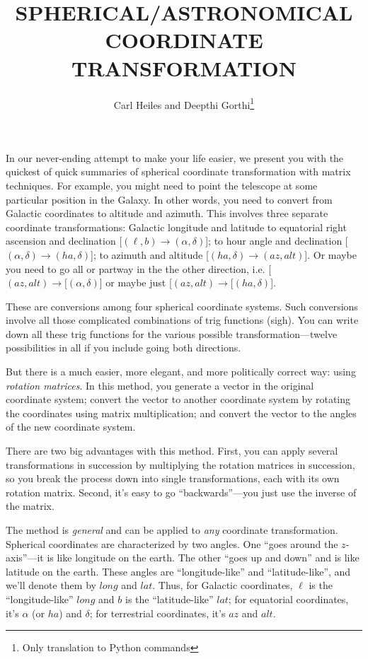 \documentclass[]{article}
\begin{document}
\title{SPHERICAL/ASTRONOMICAL COORDINATE TRANSFORMATION}
\author{Carl Heiles and Deepthi Gorthi\footnote{Only translation to Python commands}}

\maketitle

    In our never-ending attempt to make your life easier, we present
you with the quickest of quick summaries of spherical coordinate
transformation with matrix techniques.  For example, you might need to
point the telescope at some particular position in the Galaxy.  In other
words, you need to convert from Galactic coordinates to altitude and
azimuth.  This involves three separate coordinate transformations:
Galactic longitude and latitude to equatorial right ascension and
declination [$(\ell, b) \rightarrow (\alpha, \delta)$]; to hour angle
and declination [$(\alpha, \delta) \rightarrow (ha, \delta)$]; to
azimuth and altitude [$(ha, \delta) \rightarrow (az, alt)$].  Or maybe
you need to go all or partway in the the other direction, i.e.  [$(az,
alt) \rightarrow [(\alpha, \delta)$] or maybe just [$(az, alt)
\rightarrow [(ha, \delta)$]. 

    These are conversions among four spherical coordinate systems. 
Such conversions involve all those complicated combinations of trig
functions (sigh).  You can write down all these trig functions for the
various possible transformation---twelve possibilities in all if you
include going both directions. 

    But there is a much easier, more elegant, and more politically
correct way: using {\it rotation matrices}.   In this method, you
generate a vector in the original coordinate system; convert the vector
to another coordinate system by rotating the coordinates using matrix
multiplication; and convert the vector to the angles of the new
coordinate system.  

    There are two big advantages with this method.  First, you can
apply several transformations in succession by multiplying the rotation
matrices in succession, so you break the process down into single
transformations, each with its own rotation matrix.  Second, it's easy
to go ``backwards''---you just use the inverse of the matrix. 

    The method is {\it general} and can be applied to {\it any}
coordinate transformation.  Spherical coordinates are characterized by
two angles.  One ``goes around the $z$-axis''---it is like longitude on
the earth.  The other ``goes up and down'' and is like latitude on the
earth.  These angles are ``longitude-like'' and ``latitude-like'', and
we'll denote them by $long$ and $lat$.  Thus, for Galactic coordinates,
$\ell$ is the ``longitude-like'' $long$ and $b$ is the ``latitude-like''
$lat$; for equatorial coordinates, it's $\alpha$ (or $ha$) and $\delta$;
for terrestrial coordinates, it's $az$ and $alt$. 
\end{document}
